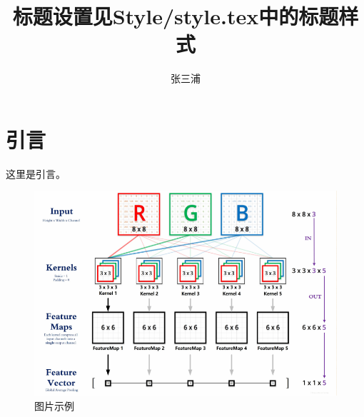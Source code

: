 

\title{标题设置见Style/style.tex中的标题样式}
\author{张三浦}

\maketitle


\section{引言}

这里是引言\cite{Runge}。

\begin{figure}[H]
	\center
	\includegraphics*[width=12cm]{Figure/1.png}
	\centering
	\caption{图片示例}\label{g1-1}
\end{figure}

\printbibliography%
